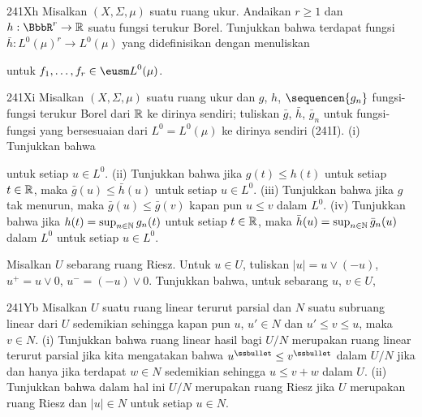 {\sqheader 241Xh Misalkan $(X,\Sigma,\mu)$ suatu ruang ukur. Andaikan
$r\ge 1$ dan $h:\BbbR^r\to\Bbb R$ suatu fungsi terukur Borel.
Tunjukkan bahwa terdapat fungsi $\bar h:L^0(\mu)^r\to L^0(\mu)$ yang
didefinisikan dengan menuliskan


\noindent untuk $f_1,\ldots,f_r\in{\eusm L}^0(\mu)$.

\spheader 241Xi Misalkan $(X,\Sigma,\mu)$ suatu ruang ukur dan $g$,
$h$, $\sequencen{g_n}$ fungsi-fungsi terukur Borel dari $\Bbb R$ ke
dirinya sendiri; tuliskan $\bar g$, $\bar h$, $\bar g_n$ untuk
fungsi-fungsi yang bersesuaian dari $L^0=L^0(\mu)$ ke dirinya sendiri
(241I). (i) Tunjukkan bahwa


\noindent untuk setiap $u\in L^0$. (ii) Tunjukkan bahwa jika
$g(t)\le h(t)$ untuk setiap $t\in\Bbb R$, maka
$\bar g(u)\le\bar h(u)$ untuk setiap $u\in L^0$. (iii) Tunjukkan bahwa
jika $g$ tak menurun, maka $\bar g(u)\le\bar g(v)$ kapan pun $u\le v$
dalam $L^0$. (iv) Tunjukkan bahwa jika
$h(t)=\sup_{n\in\Bbb N}g_n(t)$ untuk setiap $t\in\Bbb R$, maka
$\bar h(u)=\sup_{n\in\Bbb N}\bar g_n(u)$ dalam $L^0$ untuk setiap
$u\in L^0$.

Misalkan $U$ sebarang ruang Riesz. Untuk $u\in U$, tuliskan
$|u|=u\vee(-u)$, $u^+=u\vee 0$, $u^-=(-u)\vee 0$. Tunjukkan bahwa,
untuk sebarang $u$, $v\in U$,





\spheader 241Yb Misalkan $U$ suatu ruang linear terurut parsial dan
$N$ suatu subruang linear dari $U$ sedemikian sehingga kapan pun $u$,
$u'\in N$ dan $u'\le v\le u$, maka $v\in N$. (i) Tunjukkan bahwa ruang
linear hasil bagi $U/N$ merupakan ruang linear terurut parsial jika kita
mengatakan bahwa $u^{\ssbullet}\le v^{\ssbullet}$ dalam $U/N$ jika dan hanya jika
terdapat $w\in N$ sedemikian sehingga $u\le v+w$ dalam $U$. (ii)
Tunjukkan bahwa dalam hal ini $U/N$ merupakan ruang Riesz jika $U$
merupakan ruang Riesz dan $|u|\in N$ untuk setiap $u\in N$.

}
